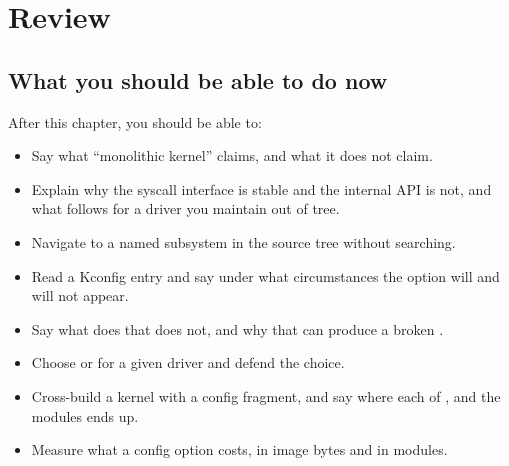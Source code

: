 
\section{Review}
\label{c3:sec:review}

\subsection*{What you should be able to do now}
After this chapter, you should be able to:
\begin{itemize}
  \item Say what ``monolithic kernel'' claims, and what it does not claim.
  \item Explain why the syscall interface is stable and the internal API is not, and what follows
    for a driver you maintain out of tree.
  \item Navigate to a named subsystem in the source tree without searching.
  \item Read a Kconfig entry and say under what circumstances the option will and will not appear.
  \item Say what  does that  does not, and why that can produce a
    broken .
  \item Choose  or  for a given driver and defend the choice.
  \item Cross-build a kernel with a config fragment, and say where each of ,
     and the modules ends up.
  \item Measure what a config option costs, in image bytes and in modules.
\end{itemize}

